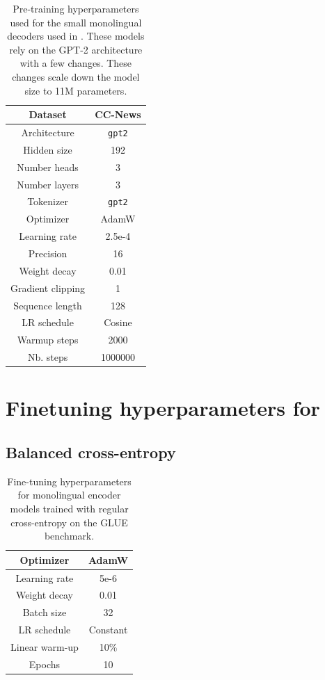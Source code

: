 \begin{appendices}
\begin{table}[H]
\centering
\small
\begin{tabular}{c|c}
\toprule
Dataset & CC-News \\ \hline
Architecture & \texttt{gpt2} \\ \hline
Hidden size & 192 \\ \hline
Number heads & 3 \\ \hline
Number layers & 3 \\ \hline
Tokenizer & \texttt{gpt2} \\ \hline
Optimizer         & AdamW      \\ \hline
Learning rate     & 2.5e-4       \\ \hline
Precision  & 16 \\ \hline
Weight decay      & 0.01       \\ \hline
Gradient clipping & 1          \\ \hline
Sequence length   & 128        \\ \hline
LR schedule       & Cosine \\ \hline
Warmup steps      & 2000      \\ \hline
Nb. steps         & 1000000        \\ \bottomrule
\end{tabular}
\caption{Pre-training hyperparameters used for the small monolingual decoders used in . These models rely on the GPT-2 architecture with a few changes. These changes scale down the model size to 11M parameters.}
\end{table}

\section{Finetuning hyperparameters for }
\label{app:ft}

\subsection{Balanced cross-entropy}
\label{app:bce}


\begin{table}[h]
\centering \small
\begin{tabular}{c|c}
\toprule
Optimizer        &   AdamW         \\ \hline
Learning rate        &   5e-6         \\ \hline
Weight decay  &     0.01      \\ \hline
Batch size & 32 \\ \hline
LR schedule & Constant \\ \hline
Linear warm-up & 10\% \\ \hline
Epochs & 10 \\ \bottomrule
\end{tabular}
\caption{Fine-tuning hyperparameters for monolingual encoder models trained with regular cross-entropy on the GLUE benchmark.}
\label{tab:hp_unbalanced}
\end{table}




\end{appendices}
